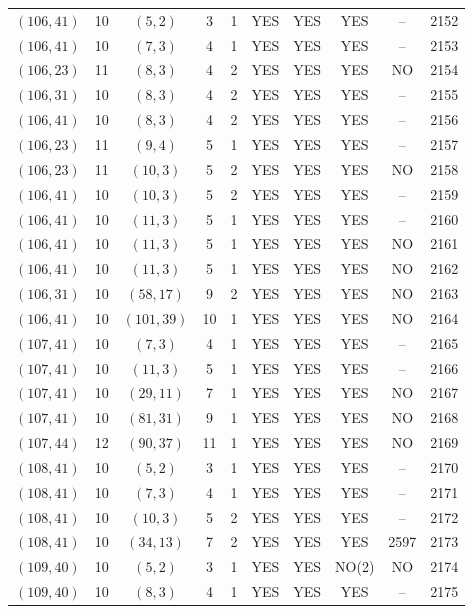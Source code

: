 \begin{longtable}{|c|c|c|c|c|c|c|c|c|c|}
$(106, 41)$ & 10 & $(5, 2)$ & 3 & 1 & YES & YES & YES & -- & 2152\\
$(106, 41)$ & 10 & $(7, 3)$ & 4 & 1 & YES & YES & YES & -- & 2153\\
$(106, 23)$ & 11 & $(8, 3)$ & 4 & 2 & YES & YES & YES & NO & 2154\\
$(106, 31)$ & 10 & $(8, 3)$ & 4 & 2 & YES & YES & YES & -- & 2155\\
$(106, 41)$ & 10 & $(8, 3)$ & 4 & 2 & YES & YES & YES & -- & 2156\\
$(106, 23)$ & 11 & $(9, 4)$ & 5 & 1 & YES & YES & YES & -- & 2157\\
$(106, 23)$ & 11 & $(10, 3)$ & 5 & 2 & YES & YES & YES & NO & 2158\\
$(106, 41)$ & 10 & $(10, 3)$ & 5 & 2 & YES & YES & YES & -- & 2159\\
$(106, 41)$ & 10 & $(11, 3)$ & 5 & 1 & YES & YES & YES & -- & 2160\\
$(106, 41)$ & 10 & $(11, 3)$ & 5 & 1 & YES & YES & YES & NO & 2161\\
$(106, 41)$ & 10 & $(11, 3)$ & 5 & 1 & YES & YES & YES & NO & 2162\\
$(106, 31)$ & 10 & $(58, 17)$ & 9 & 2 & YES & YES & YES & NO & 2163\\
$(106, 41)$ & 10 & $(101, 39)$ & 10 & 1 & YES & YES & YES & NO & 2164\\
$(107, 41)$ & 10 & $(7, 3)$ & 4 & 1 & YES & YES & YES & -- & 2165\\
$(107, 41)$ & 10 & $(11, 3)$ & 5 & 1 & YES & YES & YES & -- & 2166\\
$(107, 41)$ & 10 & $(29, 11)$ & 7 & 1 & YES & YES & YES & NO & 2167\\
$(107, 41)$ & 10 & $(81, 31)$ & 9 & 1 & YES & YES & YES & NO & 2168\\
$(107, 44)$ & 12 & $(90, 37)$ & 11 & 1 & YES & YES & YES & NO & 2169\\
$(108, 41)$ & 10 & $(5, 2)$ & 3 & 1 & YES & YES & YES & -- & 2170\\
$(108, 41)$ & 10 & $(7, 3)$ & 4 & 1 & YES & YES & YES & -- & 2171\\
$(108, 41)$ & 10 & $(10, 3)$ & 5 & 2 & YES & YES & YES & -- & 2172\\
$(108, 41)$ & 10 & $(34, 13)$ & 7 & 2 & YES & YES & YES & 2597 & 2173\\
$(109, 40)$ & 10 & $(5, 2)$ & 3 & 1 & YES & YES & NO(2) & NO & 2174\\
$(109, 40)$ & 10 & $(8, 3)$ & 4 & 1 & YES & YES & YES & -- & 2175\\

\end{longtable}
